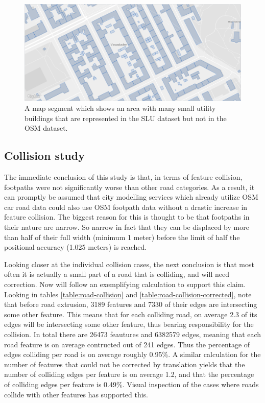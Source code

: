 \documentclass{kththesis}
\begin{document}
\begin{figure}[H]
    \centering
    \includegraphics[width=\textwidth,height=0.5\textheight,keepaspectratio]{img_map_utility_buildings}
    \caption{A map segment which shows an area with many small utility buildings that are represented in the SLU dataset but not in the OSM dataset.}
    \label{fig:osm-slu-map-utility-buildings}
\end{figure}


\subsection{Collision study}

The immediate conclusion of this study is that, in terms of feature collision, footpaths were not significantly worse than other road categories.
As a result, it can promptly be assumed that city modelling services which already utilize OSM car road data could also use OSM footpath data without a drastic increase in feature collision.
The biggest reason for this is thought to be that footpaths in their nature are narrow.
So narrow in fact that they can be displaced by more than half of their full width (minimum 1 meter) before the limit of half the positional accuracy (1.025 meters) is reached.

Looking closer at the individual collision cases, the next conclusion is that most often it is actually a small part of a road that is colliding, and will need correction.
Now will follow an exemplifying calculation to support this claim.
Looking in tables \ref{table:road-collision} and \ref{table:road-collision-corrected}, note that before road extrusion, 3189 features and 7330 of their edges are intersecting some other feature.
This means that for each colliding road, on average 2.3 of its edges will be intersecting some other feature, thus bearing responsibility for the collision.
In total there are 26473 feautures and 6382579 edges, meaning that each road feature is on average contructed out of 241 edges.
Thus the percentage of edges colliding per road is on average roughly 0.95\%.
A similar calculation for the number of features that could not be corrected by translation yields that the number of colliding edges per feature is on average 1.2, and that the percentage of colliding edges per feature is 0.49\%.
Visual inspection of the cases where roads collide with other features has supported this.
\end{document}
